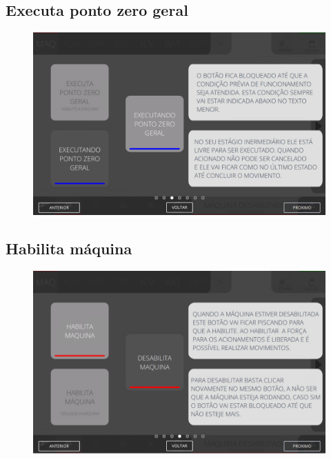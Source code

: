 \subsection{Executa ponto zero geral}
\begin{figure}
    \centering
    \includegraphics[width=576 px,height=360 px]{src/imagesICV/02-machine/4.png}
\end{figure}
\newpage
\thispagestyle{fancy}
\vspace{\fill}

\subsection{Habilita máquina}
\begin{figure}
    \centering
    \includegraphics[width=576 px,height=360 px]{src/imagesICV/02-machine/5.png}
\end{figure}
\newpage
\thispagestyle{fancy}
\vspace{\fill}

